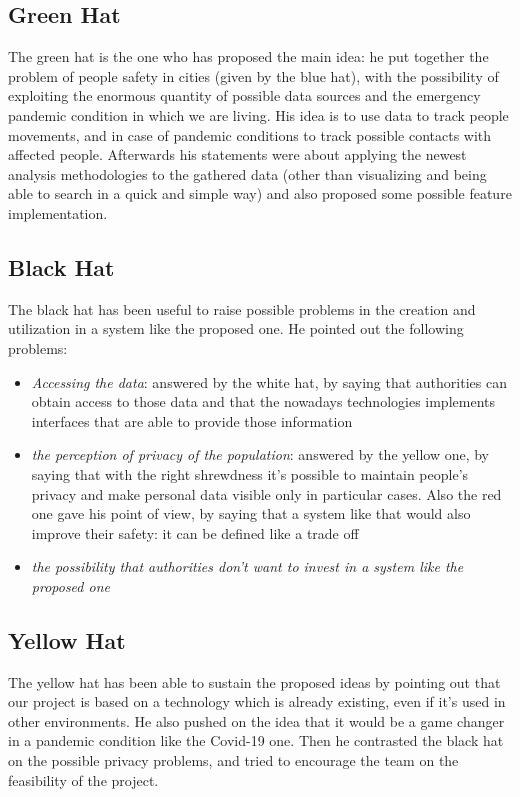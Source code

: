 \documentclass[../main.tex]{subfiles}
\begin{document}
    \subsection{Green Hat}\label{subsec:green-hat}
    The green hat is the one who has proposed the main idea: he put together the problem of people safety in cities (given by the blue hat), with the possibility of exploiting the enormous quantity of possible data sources and the emergency pandemic condition in which we are living. His idea is to use data to track people movements, and in case of pandemic conditions to track possible contacts with affected people. Afterwards his statements were about applying the newest analysis methodologies to the gathered data (other than visualizing and being able to search in a quick and simple way) and also proposed some possible feature implementation.

    \subsection{Black Hat}\label{subsec:black-hat}
    The black hat has been useful to raise possible problems in the creation and utilization in a system like the proposed one. He pointed out the following problems:
    \begin{itemize}
        \item \textit{Accessing the data}: answered by the white hat, by saying that authorities can obtain access to those data and that the nowadays technologies
        implements interfaces that are able to provide those information
        \item \textit{the perception of privacy of the population}: answered by the yellow one, by saying that with the right shrewdness
        it’s possible to maintain people's privacy and make personal data visible only in particular cases.
        Also the red one gave his point of view, by saying that a system like that would also improve their safety: it can be defined like a trade off
        \item \textit{the possibility that authorities don’t want to invest in a system like the proposed one}
    \end{itemize}


    \subsection{Yellow Hat}\label{subsec:yellow-hat}
    The yellow hat has been able to sustain the proposed ideas by pointing out that our project is based on a technology which is already existing, even if it’s used in other environments. He also pushed on the idea that it would be a game changer in a pandemic condition like the Covid-19 one. Then he contrasted the black hat on the possible privacy problems, and tried to encourage the team on the feasibility of the project.
\end{document}
